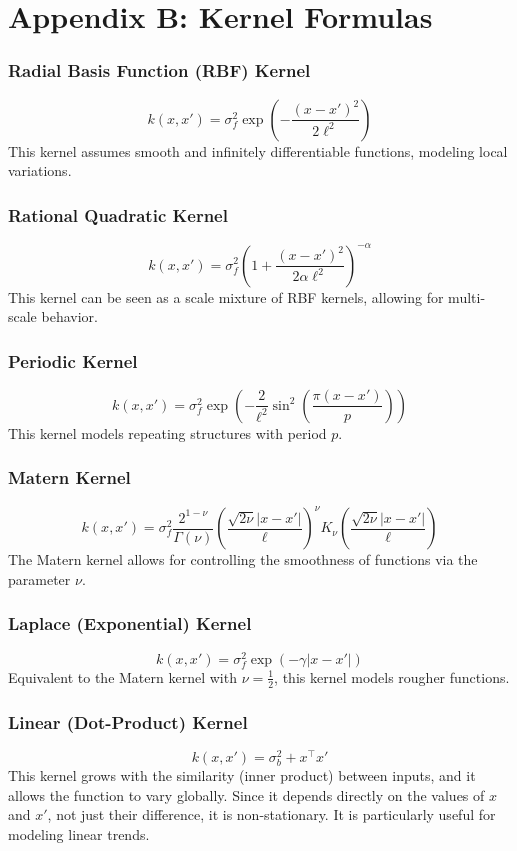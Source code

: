 \documentclass[12pt]{article}
\begin{document}
\section{Appendix B: Kernel Formulas}
\label{appendix:B}
\subsubsection*{Radial Basis Function (RBF) Kernel}
\[
k(x, x') = \sigma_f^2 \exp\left( -\frac{(x - x')^2}{2\ell^2} \right)
\]
This kernel assumes smooth and infinitely differentiable functions, modeling local variations.


\subsubsection*{Rational Quadratic Kernel}
\[
k(x, x') = \sigma_f^2 \left( 1 + \frac{(x - x')^2}{2 \alpha \ell^2} \right)^{-\alpha}
\]
This kernel can be seen as a scale mixture of RBF kernels, allowing for multi-scale behavior.


\subsubsection*{Periodic Kernel}
\[
k(x, x') = \sigma_f^2 \exp\left( -\frac{2}{\ell^2} \sin^2\left( \frac{\pi (x - x')}{p} \right) \right)
\]
This kernel models repeating structures with period \( p \).

\subsubsection*{Matern Kernel}
\[
k(x, x') = \sigma_f^2 \frac{2^{1-\nu}}{\Gamma(\nu)} \left( \frac{\sqrt{2\nu} |x - x'|}{\ell} \right)^\nu K_\nu\left( \frac{\sqrt{2\nu} |x - x'|}{\ell} \right)
\]
The Matern kernel allows for controlling the smoothness of functions via the parameter \( \nu \).


\subsubsection*{Laplace (Exponential) Kernel}
\[
k(x, x') = \sigma_f^2 \exp\left( -\gamma |x - x'| \right)
\]
Equivalent to the Matern kernel with \( \nu = \frac{1}{2} \), this kernel models rougher functions.


\subsubsection*{Linear (Dot-Product) Kernel}
\[
k(x, x') = \sigma_b^2 + x^\top x'
\]
This kernel grows with the similarity (inner product) between inputs, and it allows the function to vary globally. Since it depends directly on the values of \( x \) and \( x' \), not just their difference, it is non-stationary. It is particularly useful for modeling linear trends.
\end{document}
